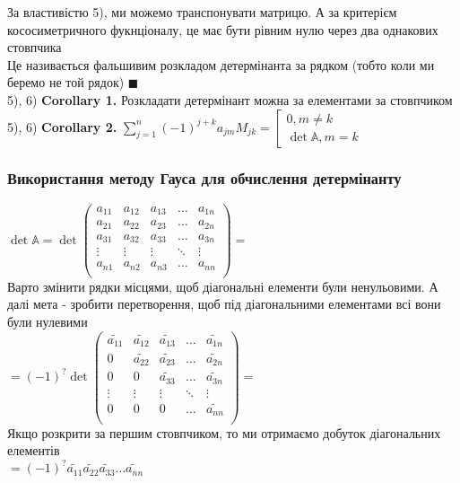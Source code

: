 \documentclass[a4paper, 14pt]{extarticle}
\def\huge{\displaystyle}
\def\bigline{\vspace{5mm}\\}
\def\qed{$\blacksquare$}
\begin{document}
За властивістю 5), ми можемо транспонувати матрицю. А за критерієм кососиметричного фукнціоналу, це має бути рівним нулю через два однакових стовпчика\\
Це називається фальшивим розкладом детермінанта за рядком (тобто коли ми беремо не той рядок) \qed
\bigline
5), 6) \textbf{Corollary 1.} Розкладати детермінант можна за елементами за стовпчиком\\
5), 6) \textbf{Corollary 2.} $\huge \sum_{j=1}^n (-1)^{j+k} a_{jm}M_{jk} = \left[\begin{gathered} 0, m \neq k \\ \det \mathbb{A}, m = k \end{gathered} \right.$
\subsubsection*{Використання методу Гауса для обчислення детермінанту}
$\det \mathbb{A} = \det \begin{pmatrix} 
a_{11} & a_{12} & a_{13} & \dots & a_{1n} \\
a_{21} & a_{22} & a_{23} & \dots & a_{2n} \\
a_{31} & a_{32} & a_{33} & \dots & a_{3n} \\
\vdots & \vdots & \vdots & \ddots & \vdots \\
a_{n1} & a_{n2} & a_{n3} & \dots & a_{nn} \\
\end{pmatrix} = $\\
Варто змінити рядки місцями, щоб діагональні елементи були ненульовими. А далі мета - зробити перетворення, щоб під діагональними елементами всі вони були нулевими\\
$= (-1)^? \det \begin{pmatrix} 
\tilde{a_{11}} & \tilde{a_{12}} & \tilde{a_{13}} & \dots & \tilde{a_{1n}} \\
0 & \tilde{a_{22}} & \tilde{a_{23}} & \dots & \tilde{a_{2n}} \\
0 & 0 & \tilde{a_{33}} & \dots & \tilde{a_{3n}} \\
\vdots & \vdots & \vdots & \ddots & \vdots \\
0 & 0 & 0 & \dots & \tilde{a_{nn}} \\
\end{pmatrix} = $\\
Якщо розкрити за першим стовпчиком, то ми отримаємо добуток діагональних елементів\\
$ = (-1)^? \tilde{a_{11}}\tilde{a_{22}}\tilde{a_{33}}\dots \tilde{a_{nn}}$
\end{document}
